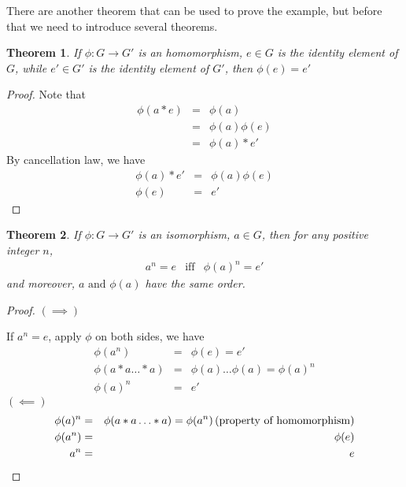 \documentclass{article}
\theoremstyle{MyNonumberplain}
\theoremstyle{break}
\newtheorem*{proof}{Proof. }
\newcommand{\p}{\phi}
\newcommand{\infixand}{\text{ and }}
\newcommand{\tmop}{\text}
\theoremstyle{break}
\newtheorem{theorem}{Theorem}[section]
\theoremstyle{break}
\theoremstyle{definition}
\theoremstyle{break}
\begin{document}
There are another theorem that can be used to prove the example, but before that we need to introduce several theorems. 

\begin{thmbox}
    \begin{theorem}
        If $\p : G \rightarrow G'$ is an homomorphism, $e \in G$ is the identity
        element of $G$, while $e' \in G'$ is the identity element of $G'$, then $\p
        (e) = e'$
    \end{theorem}
    \begin{prfbox}
        \begin{proof}
            Note that
            \begin{eqnarray*}
            \p (a \ast e) & = & \p (a)\\
            & = & \p (a) \p (e)\\
            & = & \p (a) \ast e'
            \end{eqnarray*}
            By cancellation law, we have
            \begin{eqnarray*}
            \p (a) \ast e' & = & \p (a) \p (e)\\
            \p (e) & = & e'
            \end{eqnarray*}
        \end{proof}
    \end{prfbox}
\end{thmbox}

\begin{thmbox}
    \begin{theorem}
        If $\p : G \rightarrow G'$ is an isomorphism, $a \in G$, then for any
        positive integer $n$,
        \begin{eqnarray*}
        a^n = e & \tmop{iff} & \p (a)^n = e'
        \end{eqnarray*}
        and moreover, $a \infixand \p (a)$ have the same order.
    \end{theorem}
    \begin{prfbox}
        \begin{proof}
                $(\implies)$
              
              If $a^n = e$, apply $\p$ on both sides, we have
              \begin{eqnarray*}
                \p (a^n) & = & \p (e) = e'\\
                \p (a \ast a \ldots \ast a) & = & \p (a) \ldots \p (a) = \p (a)^n\\
                \p (a)^n & = & e'
              \end{eqnarray*}
$(\impliedby)$
              \begin{eqnarray*}
                \p (a)^n & = & \p (a \ast a \ldots \ast a) = \p (a^n) \hspace*{\fill} \left(
                \text{property of homomorphism} \right)\\
                \p (a^n) & = & \p (e)\\
                a^n & = & e
              \end{eqnarray*}
        \end{proof}
    \end{prfbox}
\end{thmbox}
\end{document}
